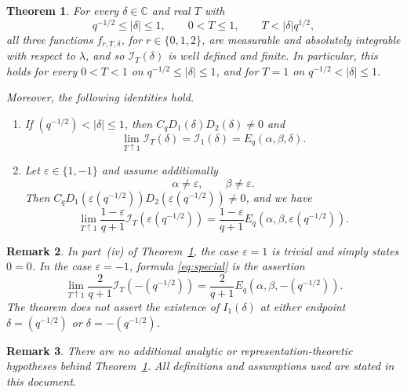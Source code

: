 \documentclass[11pt,a4paper]{article}
\newcommand{\C}{\mathbb C}
\newcommand{\abs}[1]{\lvert#1\rvert}
\newcommand{\I}{\mathcal I}
\newcommand{\E}{E_q}
\newtheorem{theorem}{Theorem}
\newtheorem{remark}  [theorem] {Remark}
\begin{document}
\begin{theorem}\label{thm:main}
For every $\delta\in\C$ and real $T$ with
\begin{equation}\label{eq:convergence}
 q^{-1/2}\le\abs\delta\le1,\qquad 0<T\le1,\qquad T<\abs\delta q^{1/2},
\end{equation}
all three functions $f_{r,T,\delta}$, for $r \in \{0,1,2\}$, are measurable and absolutely
integrable with respect to $\lambda$, and so $\I_T(\delta)$ is well defined and finite.  In particular, this holds for every
$0<T<1$ on $q^{-1/2}\le\abs\delta\le1$, and for $T=1$ on $q^{-1/2}<\abs\delta\le1$. 

Moreover, the following identities hold.
\begin{enumerate}
\item If $(q^{-1/2})<\abs\delta\le1$, then $C_qD_1(\delta)D_2(\delta)\ne0$ and
\begin{equation}\label{eq:principal}
 \boxed{\displaystyle
 \lim_{T\uparrow1}\I_T(\delta)=\I_1(\delta) = \E(\alpha,\beta,\delta).}
\end{equation}

\item Let $\varepsilon\in\{1,-1\}$ and assume additionally
\begin{equation}\label{eq:endpoint}
 \alpha\ne\varepsilon,\qquad\beta\ne\varepsilon.
\end{equation}
Then
$C_qD_1(\varepsilon (q^{-1/2}))D_2(\varepsilon (q^{-1/2}))\ne0$, and we have
\begin{equation}\label{eq:special}
 \boxed{\displaystyle
 \lim_{T\uparrow1}\frac{1-\varepsilon}{q+1}\I_T(\varepsilon (q^{-1/2}))
 =\frac{1-\varepsilon}{q+1}\E(\alpha,\beta,\varepsilon (q^{-1/2})).}
\end{equation}
\end{enumerate}
\end{theorem}

\begin{remark}

In part~(iv) of Theorem~\ref{thm:main}, the case $\varepsilon=1$
is trivial and simply states $0=0$.
In the case $\varepsilon=-1$, formula \eqref{eq:special} is the assertion
\[
 \lim_{T\uparrow1}\frac2{q+1}\I_T(-(q^{-1/2}))
 =\frac2{q+1}\E(\alpha,\beta,-(q^{-1/2})).
\]
The theorem does not assert the existence of $I_1(\delta)$ at either endpoint
$\delta=(q^{-1/2})$ or $\delta=-(q^{-1/2})$.
\end{remark}

\begin{remark}There are no additional analytic or representation-theoretic
hypotheses behind Theorem~\ref{thm:main}. All definitions and assumptions used are stated in this document.
\end{remark}
\end{document}
